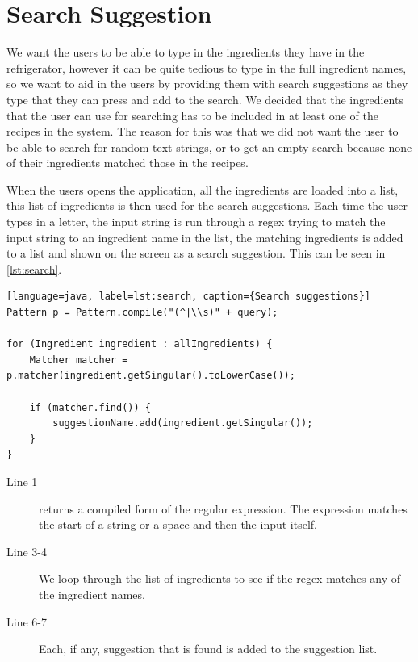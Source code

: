 \section{Search Suggestion}
We want the users to be able to type in the ingredients they have in the refrigerator, however it can be quite tedious to type in the full ingredient names, so we want to aid in the users by providing them with search suggestions as they type that they can press and add to the search. We decided that the ingredients that the user can use for searching has to be included in at least one of the recipes in the system. The reason for this was that we did not want the user to be able to search for random text strings, or to get an empty search because none of their ingredients matched those in the recipes. 

When the users opens the application, all the ingredients are loaded into a list, this list of ingredients is then used for the search suggestions. Each time the user types in a letter, the input string is run through a regex trying to match the input string to an ingredient name in the list, the matching ingredients is added to a list and shown on the screen as a search suggestion. This can be seen in \autoref{lst:search}.

\begin{lstlisting}[float][language=java, label=lst:search, caption={Search suggestions}]
Pattern p = Pattern.compile("(^|\\s)" + query);

for (Ingredient ingredient : allIngredients) {
    Matcher matcher = p.matcher(ingredient.getSingular().toLowerCase());

    if (matcher.find()) {
        suggestionName.add(ingredient.getSingular());
    }
}
\end{lstlisting}

\begin{description}
\item[Line 1]  returns a compiled form of the regular expression. The expression matches the start of a string or a space and then the input itself. 
\item[Line 3-4] We loop through the list of ingredients to see if the regex matches any of the ingredient names.
\item[Line 6-7] Each, if any, suggestion that is found is added to the suggestion list.
\end{description}

